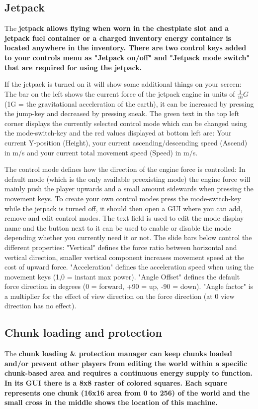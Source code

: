 \documentclass[11pt]{article} %
\begin{document}
\subsection{Jetpack}
The \bf jetpack \rm allows flying when worn in the chestplate slot and a \bf jetpack fuel container \rm or a charged \bf inventory energy container \rm is located anywhere in the inventory. There are two control keys added to your controls menu as "Jetpack on/off" and "Jetpack mode switch" that are required for using the jetpack. 

If the jetpack is turned on it will show some additional things on your screen: The bar on the left shows the current force of the jetpack engine in units of $\frac{1}{10} G$ (1G = the gravitational acceleration of the earth), it can be increased by pressing the jump-key and decreased by pressing sneak. The green text in the top left corner displays the currently selected control mode which can be changed using the mode-switch-key and the red values displayed at bottom left are: Your current Y-position (Height), your current ascending/descending speed (Ascend) in m/s and your current total movement speed (Speed) in m/s.

The control mode defines how the direction of the engine force is controlled: In default mode (which is the only available preexisting mode) the engine force will mainly push the player upwards and a small amount sidewards when pressing the movement keys. To create your own control modes press the mode-switch-key while the jetpack is turned off, it should then open a GUI where you can add, remove and edit control modes. The text field is used to edit the mode display name and the button next to it can be used to enable or disable the mode depending whether you currently need it or not. The slide bars below control the different properties: "Vertical" defines the force ratio between horizontal and vertical direction, smaller vertical component increases movement speed at the cost of upward force. "Acceleration" defines the acceleration speed when using the movement keys (1,0 = instant max power). "Angle Offset" defines the default force direction in degrees (0 = forward, +90 = up, -90 = down). "Angle factor" is a multiplier for the effect of view direction on the force direction (at 0 view direction has no effect).

\subsection{Chunk loading and protection}
The \bf chunk loading \& protection manager \rm can keep chunks loaded and/or prevent other players from editing the world within a specific chunk-based area and requires a continuous energy supply to function. In its GUI there is a 8x8 raster of colored squares. Each square represents one chunk (16x16 area from 0 to 256) of the world and the small cross in the middle shows the location of this machine.
\end{document}
